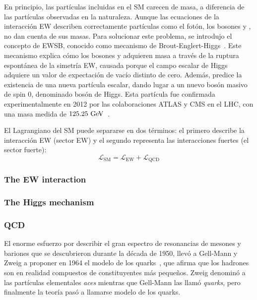 En principio, las partículas incluidas en el \ac{SM} carecen de masa, a diferencia de las partículas observadas en la naturaleza. Aunque las ecuaciones de la interacci\'on \ac{EW} describen correctamente partículas como el fotón, los bosones \Wboson y \Zboson, no dan cuenta de sus masas. Para solucionar este problema, se introdujo el concepto de \ac{EWSB}, conocido como mecanismo de Brout-Englert-Higgs~\cite{Higgs-1964_1,Higgs-1964_2,Higgs-1966,Englert_Brout-1964}. Este mecanismo explica cómo los bosones \Wboson y \Zboson adquieren masa a través de la ruptura espontánea de la simetría \ac{EW}, causada porque el campo escalar de Higgs adquiere un valor de expectaci\'on de vacío distinto de cero. Además, predice la existencia de una nueva partícula escalar, dando lugar a un nuevo bosón masivo de spin 0, denominado bosón de Higgs. Esta partícula fue confirmada experimentalmente en 2012 por las colaboraciones \ac{ATLAS} y \ac{CMS} en el \ac{LHC}, con una masa medida de \(125.25~\text{GeV}\)~\cite{ATLAS-HiggsObservation,CMS-HiggsObservation}.

El Lagrangiano del \ac{SM} puede separarse en dos términos: el primero describe la interacción \ac{EW} (sector \ac{EW}) y el segundo representa las interacciones fuertes (el sector fuerte):
\begin{equation*}
    \mathcal{L}_{\text{SM}} = \mathcal{L}_{\text{EW}} + \mathcal{L}_{\text{QCD}}
\end{equation*}








\subsubsection{The \acf{EW} interaction}


\subsubsection{The Higgs mechanism}


\subsubsection{\acf{QCD}}
\label{subsubsec:theory:sm:mathematical:qcd}

El enorme esfuerzo por describir el gran espectro de resonancias de mesones y bariones que se descubrieron durante la década de 1950, llevó a Gell-Mann y Zweig a proponer en 1964 el modelo de los quarks~\cite{Gellmann-1964,Zweig-1964_1,Zweig-1964_2}, que afirma que los hadrones son en realidad compuestos de constituyentes más pequeños. Zweig denominó a las partículas elementales \textit{aces} mientras que Gell-Mann las llamó \textit{quarks}, pero finalmente la teoría pasó a llamarse modelo de los quarks.

